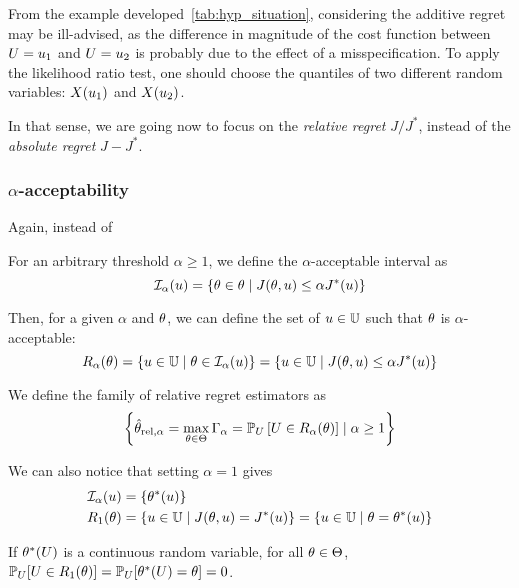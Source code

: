 \documentclass[../../Main_ManuscritThese.tex]{subfiles}
\begin{document}
From the example developed~\cref{tab:hyp_situation}, considering the additive regret may be ill-advised, as the difference in magnitude of the cost function between $U = u_1$ and $U = u_2$ is probably due to the effect of a misspecification. To apply the likelihood ratio test, one should choose the quantiles of two different random variables: $X(u_1)$ and $ X(u_2)$.

In that sense, we are going now to focus on the \emph{relative regret} $J/J^*$, instead of the \emph{absolute regret} $J - J^*$.

\subsubsection{$\alpha$-acceptability}
Again, instead of 
  \begin{definition}
  For an arbitrary threshold $\alpha \geq 1$, we define the $\alpha$-acceptable interval as
  \begin{equation}
    \mathcal{I}_{\alpha}(u) = \left\{\theta \in \theta \mid J(\theta,u) \leq \alpha J^*(u) \right\}
  \end{equation}
\end{definition}

Then, for a given $\alpha$ and $\theta$, we can define the set of $u\in \mathbb{U}$ such that $\theta$ is $\alpha$-acceptable:
\begin{equation}
  R_{\alpha}(\theta) = \left\{u \in \mathbb{U} \mid \theta \in \mathcal{I}_{\alpha}(u) \right\} = \left\{u \in \mathbb{U} \mid  J(\theta, u) \leq \alpha J^*(u) \right\}
\end{equation}

We define the family of relative regret estimators as
\begin{equation}
      \left\{\hat{\theta}_{\mathrm{rel,\alpha}} = \max_{\theta\in\Theta} \Gamma_{\alpha}= \mathbb{P}_U\left[U \in R_{\alpha}(\theta)\right]\mid \alpha \geq 1\right\}
    \end{equation}


We can also notice that setting $\alpha=1$ gives
\begin{align}
  \mathcal{I}_{\alpha}(u) &= \{\theta^*(u)\} \\
  R_1(\theta) &= \left\{u\in\mathbb{U} \mid J(\theta, u) = J^*(u)\right\} = \left\{u\in\mathbb{U} \mid \theta = \theta^*(u)\right\}
\end{align}

If $\theta^*(U)$ is a continuous random variable, for all $\theta\in\Theta$, $\mathbb{P}_{U}[U \in R_1(\theta)] = \mathbb{P}_{U}[\theta^*(U) = \theta] = 0$.
\end{document}
